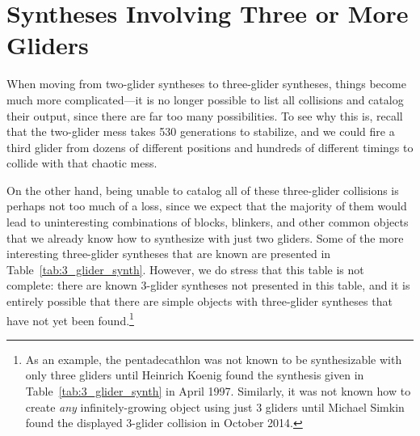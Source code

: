 \section{Syntheses Involving Three or More Gliders}\label{sec:3glidersynth}

When moving from two-glider syntheses to three-glider syntheses, things become much more complicated---it is no longer possible to list all collisions and catalog their output, since there are far too many possibilities. To see why this is, recall that the two-glider mess takes 530 generations to stabilize, and we could fire a third glider from dozens of different positions and hundreds of different timings to collide with that chaotic mess.

On the other hand, being unable to catalog all of these three-glider collisions is perhaps not too much of a loss, since we expect that the majority of them would lead to uninteresting combinations of blocks, blinkers, and other common objects that we already know how to synthesize with just two gliders. Some of the more interesting three-glider syntheses that are known are presented in Table~\ref{tab:3_glider_synth}. However, we do stress that this table is not complete: there are known 3-glider syntheses not presented in this table, and it is entirely possible that there are simple objects with three-glider syntheses that have not yet been found.\footnote{As an example, the pentadecathlon was not known to be synthesizable with only three gliders until Heinrich Koenig found the synthesis given in Table~\ref{tab:3_glider_synth} in April 1997. Similarly, it was not known how to create \emph{any} infinitely-growing object using just $3$ gliders until Michael Simkin found the displayed $3$-glider collision in October 2014.}

